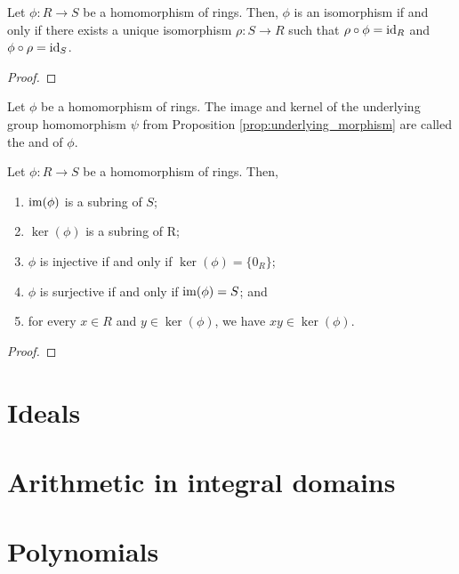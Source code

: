 \begin{prop}
Let $ \phi:R\to S $ be a homomorphism of rings. Then, $ \phi $ is an isomorphism if and only if there exists a unique isomorphism $ \rho:S\to R $ such that $ \rho\circ\phi=\operatorname{id}_R $ and $ \phi\circ\rho=\operatorname{id}_S $.
\end{prop}
\begin{proof}
\end{proof}

\begin{defn}
Let $ \phi $ be a homomorphism of rings. The image and kernel of the underlying group homomorphism $ \psi $ from Proposition \ref{prop:underlying_morphism} are called the  and  of $ \phi $.
\end{defn}

\begin{prop}
Let $ \phi:R\to S $ be a homomorphism of rings. Then,
\begin{enumerate}
    \item $ \operatorname{im}(\phi) $ is a subring of $ S $;
    \item $ \ker(\phi) $ is a subring of R;
    \item $ \phi $ is injective if and only if $ \ker(\phi)=\{0_R\} $;
    \item $ \phi $ is surjective if and only if $ \operatorname{im}(\phi)=S $; and
    \item for every $ x\in R $ and $ y\in\ker(\phi) $, we have $ xy\in\ker(\phi) $.
\end{enumerate}
\end{prop}
\begin{proof}
\end{proof}

\section{Ideals}

\section{Arithmetic in integral domains}

\section{Polynomials}

